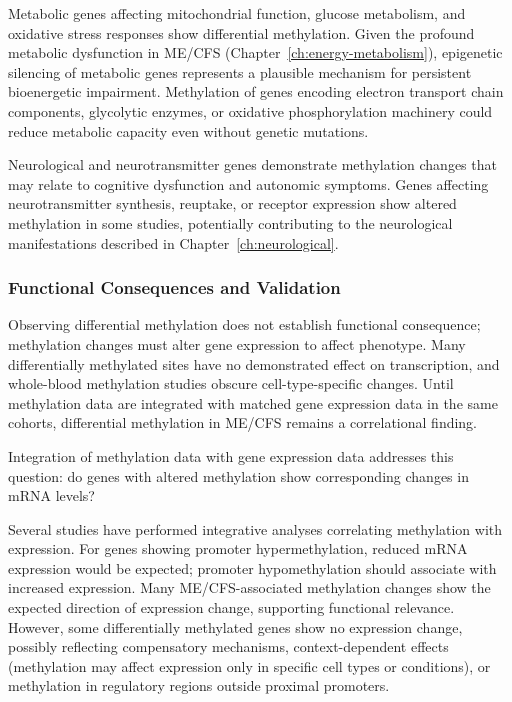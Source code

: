 Metabolic genes affecting mitochondrial function, glucose metabolism, and oxidative stress responses show differential methylation. Given the profound metabolic dysfunction in ME/CFS (Chapter~\ref{ch:energy-metabolism}), epigenetic silencing of metabolic genes represents a plausible mechanism for persistent bioenergetic impairment. Methylation of genes encoding electron transport chain components, glycolytic enzymes, or oxidative phosphorylation machinery could reduce metabolic capacity even without genetic mutations.

Neurological and neurotransmitter genes demonstrate methylation changes that may relate to cognitive dysfunction and autonomic symptoms. Genes affecting neurotransmitter synthesis, reuptake, or receptor expression show altered methylation in some studies, potentially contributing to the neurological manifestations described in Chapter~\ref{ch:neurological}.

\subsubsection{Functional Consequences and Validation}

\begin{limitation}
Observing differential methylation does not establish functional consequence; methylation changes must alter gene expression to affect phenotype. Many differentially methylated sites have no demonstrated effect on transcription, and whole-blood methylation studies obscure cell-type-specific changes. Until methylation data are integrated with matched gene expression data in the same cohorts, differential methylation in ME/CFS remains a correlational finding.
\end{limitation}

Integration of methylation data with gene expression data addresses this question: do genes with altered methylation show corresponding changes in mRNA levels?

Several studies have performed integrative analyses correlating methylation with expression. For genes showing promoter hypermethylation, reduced mRNA expression would be expected; promoter hypomethylation should associate with increased expression. Many ME/CFS-associated methylation changes show the expected direction of expression change, supporting functional relevance. However, some differentially methylated genes show no expression change, possibly reflecting compensatory mechanisms, context-dependent effects (methylation may affect expression only in specific cell types or conditions), or methylation in regulatory regions outside proximal promoters.

